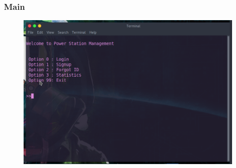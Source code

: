 \documentclass[10pt]{beamer}
\begin{document}
\begin{frame}
    \frametitle{Main}

    \begin{adjustwidth*}{-3cm}{-3cm}
    \begin{figure}
        \centering
        \includegraphics[width=1.1\textwidth]{../img/db_main_page.png}
    \end{figure}
    \end{adjustwidth*}

\end{frame}
\end{document}

